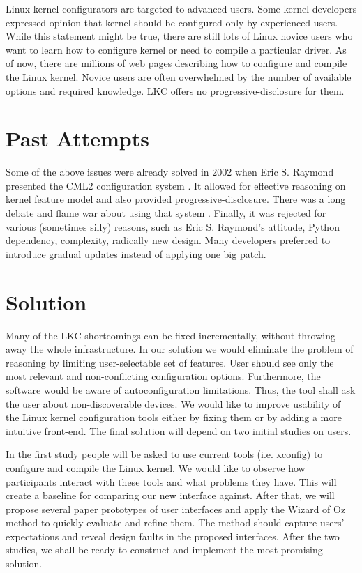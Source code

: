 \documentclass{chi2009}
\begin{document}
Linux kernel configurators are targeted to advanced users. Some kernel developers expressed opinion \cite{kernel:aunt:2002} that kernel should be configured only by experienced users. While this statement might be true, there are still lots of Linux novice users who want to learn how to configure kernel or need to compile a particular driver. As of now, there are millions of web pages describing how to configure and compile the Linux kernel. Novice users are often overwhelmed by the number of available options and required knowledge. LKC offers no progressive-disclosure for them.

\section{Past Attempts}
Some of the above issues were already solved in 2002 when Eric S. Raymond presented the CML2 configuration system \cite{raymond:cml2:2000}. It allowed for effective reasoning on kernel feature model and also provided progressive-disclosure. There was a long debate and flame war about using that system \cite{kerneltrap:linux:2002}. Finally, it was rejected for various (sometimes silly) reasons, such as Eric S. Raymond's attitude, Python dependency, complexity, radically new design. Many developers preferred to introduce gradual updates instead of applying one big patch.

\section{Solution}
Many of the LKC shortcomings can be fixed incrementally, without throwing away the whole infrastructure. In our solution we would eliminate the problem of reasoning by limiting user-selectable set of features. User should see only the most relevant and non-conflicting configuration options. Furthermore, the software would be aware of autoconfiguration limitations. Thus, the tool shall ask the user about non-discoverable devices. We would like to improve usability of the Linux kernel configuration tools either by fixing them or by adding a more intuitive front-end. The final solution will depend on two initial studies on users.

In the first study people will be asked to use current tools (i.e. \textsf{xconfig}) to configure and compile the Linux kernel. We would like to observe how participants interact with these tools and what problems they have. This will create a baseline for comparing our new interface against. After that, we will propose several paper prototypes of user interfaces and apply the Wizard of Oz method to quickly evaluate and refine them. The method should capture users' expectations and reveal design faults in the proposed interfaces. After the two studies, we shall be ready to construct and implement the most promising solution.
\end{document}
